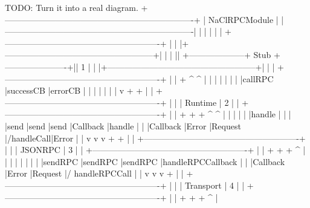 \begin{code}
TODO: Turn it into a real diagram.
+-------------------------------------------------------------------+
|                           NaClRPCModule                           |
|-------------------------------------------------------------------|
|                                                                   |
|                                                                   |
|     +-------------------------------------------------------+     |
|     |+-----------------------------------------------------+|     |
|     || +--------------------+ Stub +----------------------+|| 1   |
|     |+-----------------------------------------------------+|     |
|     +-------------------------------------------------------+     |
|                 +                      ^            ^             |
|                 |                      |            |             |
|                 |callRPC               |successCB   |errorCB      |
|                 |                      |            |             |
|                 v                      +            +             |
|     +-------------------------------------------------------+     |
|     |                        Runtime                        | 2   |
|     +-------------------------------------------------------+     |
|      +          +        +                ^           ^           |
|      |          |        |                |handle     |           |
|      |send      |send    |send            |Callback   |handle     |
|      |Callback  |Error   |Request         |/handleCall|Error      |
|      v          v        v                +           +           |
|     +-------------------------------------------------------+     |
|     |                        JSONRPC                        | 3   |
|     +-------------------------------------------------------+     |
|      +         +         +                ^                       |
|      |         |         |                |                       |
|      |sendRPC  |sendRPC  |sendRPC         |handleRPCCallback      |
|      |Callback |Error    |Request         |/ handleRPCCall        |
|      v         v         v                +                       |
|     +-------------------------------------------------------+     |
|     |                       Transport                       | 4   |
|     +-------------------------------------------------------+     |
|         +        +       +                ^                       |

\end{code}
